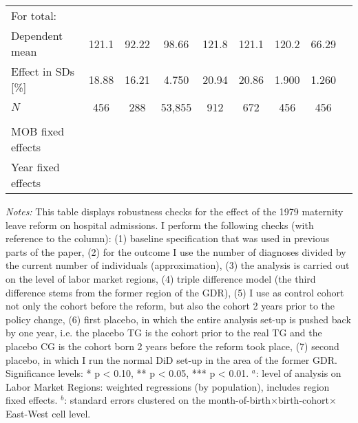 \begin{landscape}
\begin{table}[H]
\begin{threeparttable}
{\begin{tabular}{l*{8}{c}}
					\midrule            																																							
					For total: 																																					\\							 
					Dependent mean 		&   121.1			&	92.22			&   98.66     		&	121.8			&  121.1			&	120.2			&	66.29		\\
					Effect in SDs [\%] 	&   18.88			&	16.21			&   4.750      		&	20.94			&  20.86			&	1.900			&	1.260		\\
					$N$ 				&   456				&	288				&   53,855    		&	912				&  672				&	456 			&	456			\\
					\\
					MOB fixed effects 	&   \checkmark		&	\checkmark		&   \checkmark		& \checkmark		& \checkmark		&	\checkmark		&  \checkmark	\\ 
					Year fixed effects  &   \checkmark		&	\checkmark		&   \checkmark		& \checkmark		& \checkmark		&	\checkmark		&  \checkmark	\\ 
					\bottomrule
			\end{tabular}}
			\begin{tablenotes}
				\item \scriptsize \emph{Notes:} This table displays robustness checks for the effect of the 1979 maternity leave reform on hospital admissions. I perform the following checks (with reference to the column): (1) baseline specification that was used in previous parts of the paper, (2) for the outcome I use the number of diagnoses divided by the current number of individuals (approximation), (3) the analysis is carried out on the level of labor market regions, (4) triple difference model (the third difference stems from the former region of the GDR), (5) I use as control cohort not only the cohort before the reform, but also the cohort 2 years prior to the policy change, (6) first placebo, in which the entire analysis set-up is pushed back by one year, i.e. the placebo TG is the cohort prior to the real TG and the placebo CG is the cohort born 2 years before the reform took place, (7) second placebo, in which I run the normal DiD set-up in the area of the former GDR. \newline Significance levels: * p < 0.10, ** p < 0.05, *** p < 0.01. \newline
				\hspace*{15 pt}$^a$: level of analysis on Labor Market Regions: weighted regressions (by population), includes region fixed effects.\newline
				\hspace*{15 pt}$^b$: standard errors clustered on the month-of-birth$\times$birth-cohort$\times$East-West cell level.
			\end{tablenotes}
		\end{threeparttable} 
	\end{table} 
	\vspace*{\fill}\clearpage
\end{landscape}
\restoregeometry





